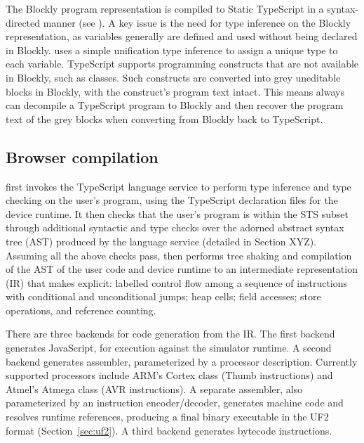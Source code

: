 The Blockly program representation is compiled to Static TypeScript in a syntax-directed manner
(see \emph{}). A key issue 
is the need for type inference on the Blockly representation, as variables generally are defined and used without
being declared in Blockly. \MC uses a simple unification type inference to assign a
unique type to each variable.  
TypeScript supports programming constructs that are not available in Blockly, such as classes.
Such constructs are converted into grey uneditable blocks in Blockly, with the construct's program
text intact. This means \MC always can decompile a TypeScript program to Blockly and then recover
the program text of the grey blocks when converting from Blockly back to TypeScript.

\subsection{Browser compilation}

\MC first invokes the TypeScript language service to perform type inference and type checking on the 
user's program, using the TypeScript declaration files for the device runtime.   It then checks that the
user's program is within the STS subset through additional syntactic and type checks over the adorned
abstract syntax tree (AST) produced by the language service (detailed in Section XYZ).  Assuming all the
above checks pass, \MC then performs tree shaking and compilation of the AST of the user code and
device runtime to an intermediate representation (IR) that makes explicit: labelled control flow among a
sequence of instructions with conditional and unconditional jumps; heap cells; field accesses; store operations,
and reference counting.

There are three backends for code generation from the IR. The first backend generates JavaScript,
for execution against the simulator runtime.  A second backend generates assembler, parameterized by a
processor description.  Currently supported processors include ARM's Cortex class (Thumb instructions)
and Atmel's Atmega class (AVR instructions). A separate assembler, also parameterized by an instruction
encoder/decoder, generates machine code and resolves runtime references, producing a final binary executable
in the UF2 format (Section~\ref{sec:uf2}). A third backend generates bytecode instructions.


